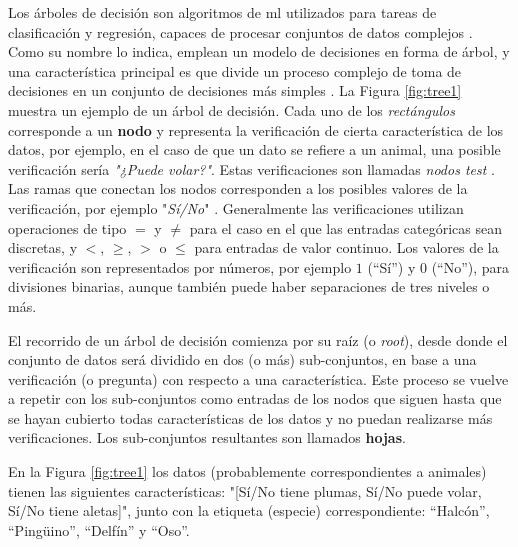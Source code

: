 Los árboles de decisión son algoritmos de \acrshort{ml} utilizados para tareas de clasificación y regresión, capaces de procesar conjuntos de datos complejos \cite{Geron}.
%
Como su nombre lo indica, emplean un modelo de decisiones en forma de árbol, y una característica principal es que divide un proceso complejo de toma de decisiones en un conjunto de decisiones más simples \cite{Safavian}.
%
La Figura \ref{fig:tree1} muestra un ejemplo de un árbol de decisión. 
%
Cada uno de los \textit{rectángulos} corresponde a un \textbf{nodo} y representa la verificación de cierta característica de los datos, por ejemplo, en el caso de que un dato se refiere a un animal, una posible verificación sería \textit{"¿Puede volar?"}. Estas verificaciones son llamadas \textit{nodos test} \cite{Muller}. 
%
Las ramas que conectan los nodos corresponden a los posibles valores de la verificación, por ejemplo "\textit{Sí/No}" \cite{Mitchell}. Generalmente las verificaciones utilizan operaciones de tipo $=$ y $\neq$ para el caso en el que las entradas categóricas sean discretas, y $<$, $\ge$, $>$ o $\le$ para entradas de valor continuo. Los valores de la verificación son representados por números, por ejemplo $1$ (``Sí'') y $0$ (``No''), para divisiones binarias, aunque también puede haber separaciones de tres niveles o más.
%

El recorrido de un árbol de decisión comienza por su raíz (o \emph{root}), desde donde el conjunto de datos será dividido en dos (o más) sub-conjuntos, en base a una verificación (o pregunta) con respecto a una característica.
%
Este proceso se vuelve a repetir con los sub-conjuntos como entradas de los nodos que siguen hasta que se hayan cubierto todas características de los datos y no puedan realizarse más verificaciones. 
%
Los sub-conjuntos resultantes son llamados \textbf{hojas}. 
%

En la Figura \ref{fig:tree1} los datos (probablemente correspondientes a animales) tienen las siguientes características: "[Sí/No tiene plumas, Sí/No puede volar, Sí/No tiene aletas]", junto con la etiqueta (especie) correspondiente: ``Halcón'', ``Pingüino'', ``Delfín'' y ``Oso''.

